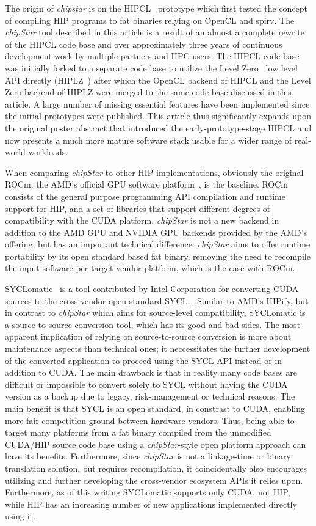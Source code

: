 \documentclass[Afour,sageh,times]{sagej}
\newcommand{\chipstar}{\textit{chipStar}\xspace}
\newcommand{\mycite}[1]{\citep{#1}}
\begin{document}
The origin of \textit{chipstar} is on the HIPCL~\mycite{HIPCL} prototype which first tested the concept of compiling HIP programs to fat binaries relying on OpenCL and \gls{spirv}. The \chipstar tool described in this article is a result of an almost a complete rewrite of the HIPCL code base and over approximately three years of continuous development work by multiple partners and HPC users. The HIPCL code base was initially forked to a separate code base to utilize the Level Zero~\mycite{l0} low level API directly (HIPLZ~\mycite{HIPLZ}) after which the OpenCL backend of HIPCL and the Level Zero backend of HIPLZ were merged to the same code base discussed in this article.
A large number of missing essential features have been implemented since the initial prototypes were published. This article thus significantly expands upon the original poster abstract that introduced the early-prototype-stage HIPCL and now presents a much more mature software stack usable for a wider range of real-world workloads.

When comparing \chipstar to other HIP implementations, obviously the original ROCm, the AMD's official GPU software platform~\mycite{ROCm}, is the baseline. ROCm consists of the general purpose programming API compilation and runtime support for HIP, and a set of libraries that support different degrees of compatibility with the CUDA platform. \chipstar is not a new backend in addition to the AMD GPU and NVIDIA GPU backends provided by the AMD's offering, but has an important technical difference: \chipstar aims to offer runtime portability by its open standard based fat binary, removing the need to recompile the input software per target vendor platform, which is the case with ROCm.

SYCLomatic~\mycite{SYCLomatic} is a tool contributed by Intel Corporation for converting CUDA sources to the cross-vendor open standard SYCL~\mycite{SYCL}. Similar to AMD's HIPify, but in contrast to \chipstar which aims for source-level compatibility, SYCLomatic is a source-to-source conversion tool, which has its good and bad sides. The most apparent implication of relying on source-to-source conversion is more about maintenance aspects than technical ones; it neccessitates the further development of the converted application to proceed using the SYCL API instead or in addition to CUDA. The main drawback is that in reality many code bases are difficult or impossible to convert solely to SYCL without having the CUDA version as a backup due to legacy, risk-management or technical reasons. The main benefit is that SYCL is an open standard, in constrast to CUDA, enabling more fair competition ground between hardware vendors. Thus, being able to target many platforms from a fat binary compiled from the unmodified CUDA/HIP source code base using a \chipstar-style open platform approach can have its benefits. Furthermore, since \chipstar is not a linkage-time or binary translation solution, but requires recompilation, it coincidentally also encourages utilizing and further developing the cross-vendor ecosystem APIs it relies upon. Furthermore, as of this writing SYCLomatic supports only CUDA, not HIP, while HIP has an increasing number of new applications implemented directly using it.
\end{document}
